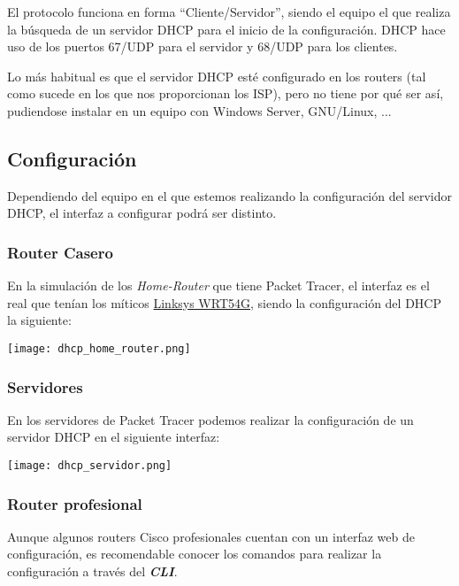 El protocolo funciona en forma “Cliente/Servidor”, siendo el equipo el que realiza la búsqueda de un servidor DHCP para el inicio de la configuración. DHCP hace uso de los puertos 67/UDP para el servidor y 68/UDP para los clientes.

Lo más habitual es que el servidor DHCP esté configurado en los routers (tal como sucede en los que nos proporcionan los ISP), pero no tiene por qué ser así, pudiendose instalar en un equipo con Windows Server, GNU/Linux, ...

\subsection{Configuración}
Dependiendo del equipo en el que estemos realizando la configuración del servidor DHCP, el interfaz a configurar podrá ser distinto.


\subsubsection{Router Casero}
En la simulación de los \textit{Home-Router} que tiene Packet Tracer, el interfaz es el real que tenían los míticos \href{https://es.wikipedia.org/wiki/WRT54G}{Linksys WRT54G}, siendo la configuración del DHCP la siguiente:

\begin{center}
    \vspace{-15pt}
    \texttt{[image: dhcp\_home\_router.png]}
    \vspace{-15pt}
\end{center}

\subsubsection{Servidores}
En los servidores de Packet Tracer podemos realizar la configuración de un servidor DHCP en el siguiente interfaz:

\begin{center}
    \vspace{-15pt}
    \texttt{[image: dhcp\_servidor.png]}
    \vspace{-15pt}
\end{center}


\subsubsection{Router profesional}
Aunque algunos routers Cisco profesionales cuentan con un interfaz web de configuración, es recomendable conocer los comandos para realizar la configuración a través del \textit{\textbf{CLI}}.

